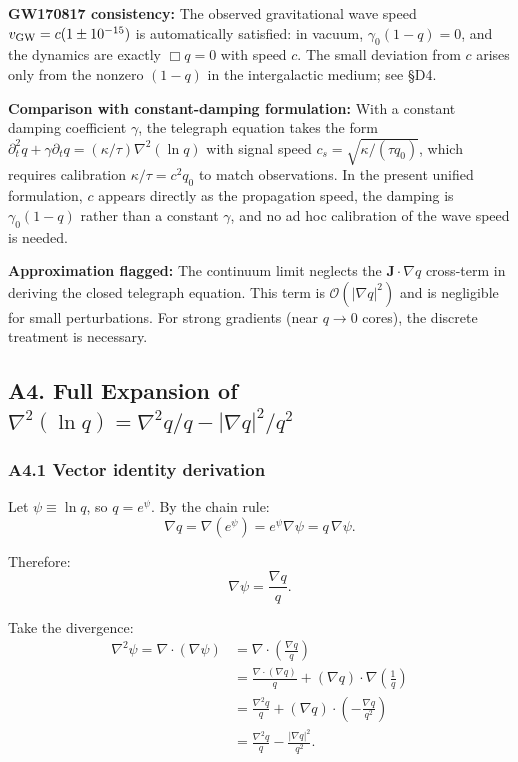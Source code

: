 \documentclass[reprint]{revtex4-2}
\begin{document}
\textbf{GW170817 consistency:} The observed gravitational wave speed $v_{\rm GW} = c(1 \pm 10^{-15})$ is automatically satisfied: in vacuum, $\gamma_0(1-q)=0$, and the dynamics are exactly $\Box q=0$ with speed $c$. The small deviation from $c$ arises only from the nonzero $(1-q)$ in the intergalactic medium; see \S D4.

\textbf{Comparison with constant-damping formulation:} With a constant damping coefficient $\gamma$, the telegraph equation takes the form $\partial_t^2 q + \gamma\partial_t q = (\kappa/\tau)\nabla^2(\ln q)$ with signal speed $c_s = \sqrt{\kappa/(\tau q_0)}$, which requires calibration $\kappa/\tau = c^2 q_0$ to match observations. In the present unified formulation, $c$ appears directly as the propagation speed, the damping is $\gamma_0(1-q)$ rather than a constant $\gamma$, and no ad hoc calibration of the wave speed is needed.

\textbf{Approximation flagged:} The continuum limit neglects the $\mathbf{J}\cdot\nabla q$ cross-term in deriving the closed telegraph equation. This term is $\mathcal{O}(|\nabla q|^2)$ and is negligible for small perturbations. For strong gradients (near $q\to 0$ cores), the discrete treatment is necessary.

\subsection{A4. Full Expansion of $\nabla^2(\ln q) = \nabla^2 q/q - |\nabla q|^2/q^2$}

\subsubsection{A4.1 Vector identity derivation}

Let $\psi \equiv \ln q$, so $q = e^\psi$. By the chain rule:
\begin{equation}
\nabla q = \nabla(e^\psi) = e^\psi \nabla\psi = q\,\nabla\psi.
\end{equation}

Therefore:
\begin{equation}
\nabla\psi = \frac{\nabla q}{q}.
\end{equation}

Take the divergence:
\begin{align}
\nabla^2\psi = \nabla\cdot(\nabla\psi) &= \nabla\cdot\left(\frac{\nabla q}{q}\right)\\
&= \frac{\nabla\cdot(\nabla q)}{q} + (\nabla q)\cdot\nabla\left(\frac{1}{q}\right)\\
&= \frac{\nabla^2 q}{q} + (\nabla q)\cdot\left(-\frac{\nabla q}{q^2}\right)\\
&= \frac{\nabla^2 q}{q} - \frac{|\nabla q|^2}{q^2}.
\end{align}
\end{document}
